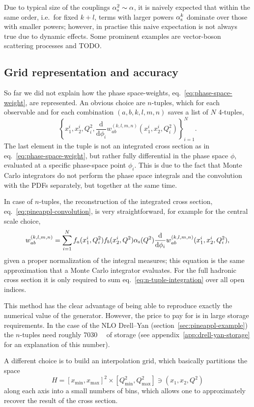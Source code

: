 Due to typical size of the couplings $\alpha_\mathrm{s}^2 \sim \alpha$, it is naively expected that within the same order, i.e.\ for fixed $k + l$, terms with larger powers $\alpha_\mathrm{s}^k$ dominate over those with smaller powers; however, in practise this naive expectation is not always true due to dynamic effects.
Some prominent examples are vector-boson scattering processes and TODO.

\subsection{Grid representation and accuracy}
\label{sec:grid-representation}

So far we did not explain how the phase space-weights, eq.~\ref{eq:phase-space-weight}, are represented.
An obvious choice are $n$-tuples, which for each observable and for each combination $(a, b, k, l, m, n)$ saves a list of $N$ 4-tuples,
\begin{equation}
\left\{ x_1^i, x_2^i, Q^2_i, \frac{\mathrm{d}}{\mathrm{d} \phi_i} w^{(k,l,m,n)}_{ab} (x_1^i, x_2^i, Q^2_i) \right\}_{i=1}^N \text{.}
\end{equation}
The last element in the tuple is not an integrated cross section as in eq.~\eqref{eq:phase-space-weight}, but rather fully differential in the phase space $\phi$, evaluated at a specific phase-space point $\phi_i$.
This is due to the fact that Monte Carlo integrators do not perform the phase space integrals and the convolution with the PDFs separately, but together at the same time.

In case of $n$-tuples, the reconstruction of the integrated cross section, eq.~\eqref{eq:pineappl-convolution}, is very straightforward, for example for the central scale choice,
\begin{equation}
w_{ab}^{(k,l,m,n)} = \sum_{i=1}^N f_a (x_1^i, Q^2_i) f_b (x_2^i, Q^2) \alpha_\mathrm{s} (Q^2) \frac{\mathrm{d}}{\mathrm{d} \phi_i} w^{(k,l,m,n)}_{ab} (x_1^i, x_2^i, Q^2_i) \text{,} \label{eq:n-tuple-integration}
\end{equation}
given a proper normalization of the integral measures; this equation is the same approximation that a Monte Carlo integrator evaluates.
For the full hadronic cross section it is only required to sum eq.~\eqref{eq:n-tuple-integration} over all open indices.

This method has the clear advantage of being able to reproduce exactly the numerical value of the generator.
However, the price to pay for is in large storage requirements.
In the case of the NLO Drell--Yan (section~\ref{sec:pineappl-example}) the $n$-tuples need roughly \SI{7030}{\giga\byte} of storage (see appendix~\ref{app:drell-yan-storage} for an explanation of this number).

A different choice is to build an interpolation grid, which basically partitions the space
\begin{equation}
H = [x_\mathrm{min},x_\mathrm{max}]^2 \times [Q^2_\mathrm{min}, Q^2_\mathrm{max}] \ni (x_1, x_2, Q^2)
\end{equation}
along each axis into a small numbers of bins, which allows one to approximately recover the result of the cross section.
